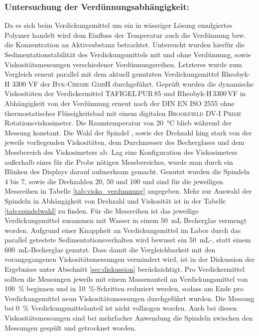 \subsubsection{Untersuchung der Verdünnungsabhängigkeit:} Da es sich beim Verdickungsmittel um ein in wässriger Lösung emulgiertes Polymer handelt wird dem Einfluss der Temperatur auch die Verdünnung bzw. die Konzentration an Aktivsubstanz betrachtet. 
Untersucht wurden hierfür die Sedimentationstabilität des Verdickungsmittels mit und ohne Verdünnung, sowie Viskositätsmessungen verschiedener Verdünnungsreihen. Letzteres wurde zum Vergleich erneut parallel mit dem aktuell genutzten Verdickungsmittel Rheobyk-H 3300 VF der \textsc{Byk-Chemie GmbH} durchgeführt.
Geprüft wurden die dynamische Viskositäten der Verdickermittel TAFIGEL\,PUR\,85 und Rheobyk-H\,3300\,VF in Abhängigkeit von der Verdünnung erneut nach der DIN EN ISO 2555 ohne thermostatisches Flüssigkeitsbad mit einem digitalen \textsc{Brookfield DV-I Prime} Rotationsviskosimeter. Die Raumtemperatur von \SI{20}{\celsius} blieb während der Messung konstant. Die Wahl der Spindel , sowie der Drehzahl hing stark von der jeweils vorliegenden Viskositäten, dem Durchmesser des Becherglases und dem Messbereich des Viskosimeters ab. Lag eine Konfiguration des Viskosimeters außerhalb eines für die Probe nötigen Messbereiches, wurde man durch ein Blinken des Displays darauf aufmerksam gemacht. Genutzt wurden die Spindeln 4 bis 7, sowie die Drehzahlen 20, 50 und \SI{100}{\rpm} und sind für die jeweiligen Messreihen in Tabelle \ref{tab:visko_verdunnung} angegeben. Mehr zur Auswahl der Spindeln in Abhängigkeit von Drehzahl und Viskosität ist in der Tabelle \ref{tab:spindelwahl} zu finden.\linebreak
Für die Messreihen ist das jeweilige Verdickungsmittel zusammen mit Wasser in einem \SI{50}{\milli \liter} Becherglas vermengt worden. Aufgrund einer Knappheit an Verdickungsmittel im Labor durch das parallel getestete Sedimentationsverhalten wird bewusst ein \SI{50}{\milli \liter}-, statt einem  \SI{600}{\milli \liter}-Becherglas genutzt. Dass damit die Vergleichbarkeit mit den vorangegangenen Viskositätsmessungen vermindert wird, ist in der Diskussion der Ergebnisse unter Abschnitt \ref{sec:diskussion} berücksichtigt. Pro Verdickermittel sollten die Messungen  jeweils mit einem Massenanteil an Verdickungsmittel von \SI{100}{\percent} beginnen und in \SI{10}{\percent}-Schritten reduziert werden, sodass am Ende pro Verdickungsmittel neun Viskositätsmessungen durchgeführt wurden. Die Messung bei \SI{0}{\percent} Verdickungsmittelanteil ist nicht vollzogen worden. Auch bei diesen Viskositätsmessungen sind bei mehrfacher Anwendung die Spindeln zwischen den Messungen gespült und getrocknet worden. 


